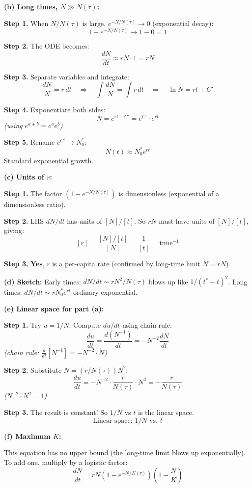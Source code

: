 \documentclass[10pt]{article}
\newcommand{\thus}{\quad\Longrightarrow\quad}
\newcommand{\stepwhy}[1]{\textcolor{blue!60!black}{\small\textit{(#1)}}}
\begin{document}
\begin{solution}
\medskip\textbf{(b) Long times, $N \gg N(\tau)$:}

\textbf{Step 1.} When $N/N(\tau)$ is large, $e^{-N/N(\tau)} \to 0$ (exponential decay):
\[
1 - e^{-N/N(\tau)} \to 1 - 0 = 1
\]

\textbf{Step 2.} The ODE becomes:
\[
\frac{dN}{dt} \approx rN\cdot 1 = rN
\]

\textbf{Step 3.} Separate variables and integrate:
\[
\frac{dN}{N} = r\,dt \thus \int\frac{dN}{N} = \int r\,dt \thus \ln N = rt + C'
\]

\textbf{Step 4.} Exponentiate both sides:
\[
N = e^{rt + C'} = e^{C'}\cdot e^{rt}
\]
\stepwhy{using $e^{a+b} = e^a e^b$}

\textbf{Step 5.} Rename $e^{C'} \to N_0^*$:
\[
\boxed{N(t) \approx N_0^* e^{rt}}
\]
Standard exponential growth.

\medskip\textbf{(c) Units of $r$:}

\textbf{Step 1.} The factor $(1 - e^{-N/N(\tau)})$ is dimensionless (exponential of a dimensionless ratio).

\textbf{Step 2.} LHS $dN/dt$ has units of $[N]/[t]$. So $rN$ must have units of $[N]/[t]$, giving:
\[
[r] = \frac{[N]/[t]}{[N]} = \frac{1}{[t]} = \text{time}^{-1}
\]

\textbf{Step 3.} \textbf{Yes}, $r$ is a per-capita rate (confirmed by long-time limit $\dot N = rN$).

\medskip\textbf{(d) Sketch:} Early times: $dN/dt \sim r N^2/N(\tau)$ blows up like $1/(t^*-t)^2$. Long times: $dN/dt \sim rN_0^* e^{rt}$ ordinary exponential.

\medskip\textbf{(e) Linear space for part (a):}

\textbf{Step 1.} Try $u = 1/N$. Compute $du/dt$ using chain rule:
\[
\frac{du}{dt} = \frac{d(N^{-1})}{dt} = -N^{-2}\frac{dN}{dt}
\]
\stepwhy{chain rule: $\frac{d}{dt}[N^{-1}] = -N^{-2}\cdot \dot N$}

\textbf{Step 2.} Substitute $\dot N = (r/N(\tau))N^2$:
\[
\frac{du}{dt} = -N^{-2}\cdot\frac{r}{N(\tau)}\cdot N^2 = -\frac{r}{N(\tau)}
\]
\stepwhy{$N^{-2}\cdot N^2 = 1$}

\textbf{Step 3.} The result is constant! So $1/N$ vs $t$ is the linear space.
\[
\boxed{\text{Linear space: } 1/N \text{ vs.\ } t}
\]

\medskip\textbf{(f) Maximum $K$:}

This equation has no upper bound (the long-time limit blows up exponentially). To add one, multiply by a logistic factor:
\[
\frac{dN}{dt} = rN(1-e^{-N/N(\tau)})\left(1-\frac{N}{K}\right)
\]
\end{solution}
\end{document}

